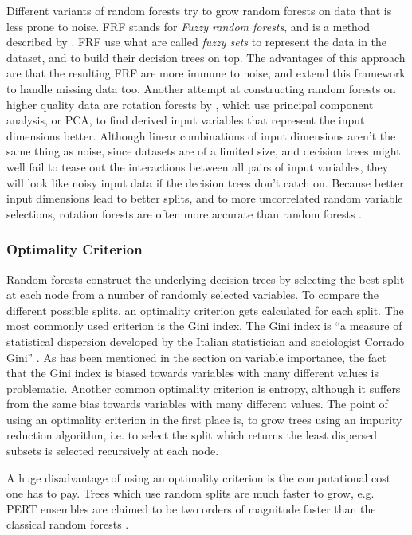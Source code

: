 \documentclass[a4paper,man,12pt,apacite,floatsintext,draftfirst]{apa6} %
\begin{document}
Different variants of random forests try to grow random forests on data
that is less prone to noise.
FRF stands for \emph{Fuzzy random forests}, and is a method described by
\cite{bonissone2008fuzzy}.
FRF use what are called \emph{fuzzy sets} to represent the data in the dataset,
and to build their decision trees on top.
The advantages of this approach are that the resulting FRF are more immune
to noise, and \cite{cadenas2012extending} extend this framework to
handle missing data too.
Another attempt at constructing random forests on higher quality data are
rotation forests by \cite{rodriguez2006rotation}, which use
principal component analysis, or PCA, to find derived input variables that
represent the input dimensions better.
Although linear combinations of input dimensions aren't the same thing
as noise, since datasets are of a limited size, and decision trees
might well fail to tease out the interactions between all pairs of input
variables, they will look like noisy input data if the decision trees
don't catch on.
Because better input dimensions lead to better splits, and to more
uncorrelated random variable selections, rotation forests are often more
accurate than random forests \cite{rodriguez2006rotation}.

\subsubsection{Optimality Criterion}
Random forests construct the underlying decision trees by selecting the
best split at each node from a number of randomly selected variables.
To compare the different possible splits, an optimality criterion gets
calculated for each split.
The most commonly used criterion is the Gini index.
The Gini index is “a measure of statistical dispersion developed by the
Italian statistician and sociologist Corrado Gini” \cite{wpGINI}.
As has been mentioned in the section on variable importance, the fact that
the Gini index is biased towards variables with many different values
is problematic.
Another common optimality criterion is entropy, although it suffers from
the same bias towards variables with many different values.
The point of using an optimality criterion in the first place is,
to grow trees using an impurity reduction algorithm, i.e. to select the split
which returns the least dispersed subsets is selected recursively at each node.

A huge disadvantage of using an optimality criterion is the computational cost
one has to pay.
Trees which use random splits are much faster to grow, e.g. PERT ensembles
are claimed to be two orders of magnitude faster than the classical
random forests \cite{cutler2001pert}.
\end{document}

